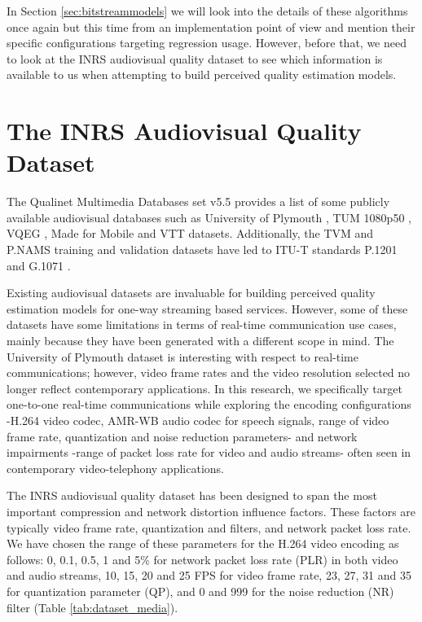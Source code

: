 \documentclass[journal]{IEEEtran}
\begin{document}
In Section \ref{sec:bitstreammodels} we will look into the details of these algorithms once again but this time from an implementation point of view and mention their specific configurations targeting regression usage. However, before that, we need to look at the INRS audiovisual quality dataset to see which information is available to us when attempting to build perceived quality estimation models.

\newcommand{\frigginfigurewidth}{2.4in}
\section{The INRS Audiovisual Quality Dataset}
\label{sec:dataset}

The Qualinet Multimedia Databases set v5.5 \cite{fliegel2014qualinet} provides a list of some publicly available audiovisual databases such as University of Plymouth \cite{goudarzi2010audiovisual}, TUM 1080p50 \cite{keimel2012tum}, VQEG \cite{pinson2012influence}, Made for Mobile \cite{robitza2012made} and VTT \cite{maki2013reduced} datasets. Additionally, the TVM and P.NAMS training and validation datasets \cite{garcia2014parametric} have led to ITU-T standards P.1201 \cite{itut2012P.1201} and G.1071 \cite{itut2015G.1071}.

Existing audiovisual datasets are invaluable for building perceived quality estimation models for one-way streaming based services. However, some of these datasets have some limitations in terms of real-time communication use cases, mainly because they have been generated with a different scope in mind. The University of Plymouth dataset is interesting with respect to real-time communications; however, video frame rates and the video resolution selected no longer reflect contemporary applications. In this research, we specifically target one-to-one real-time communications while exploring the encoding configurations -H.264 video codec, AMR-WB audio codec for speech signals, range of video frame rate, quantization and noise reduction parameters- and network impairments -range of packet loss rate for video and audio streams- often seen in contemporary video-telephony applications.

The INRS audiovisual quality dataset has been designed to span the most important compression and network distortion influence factors. These factors are typically video frame rate, quantization and filters, and network packet loss rate. We have chosen the range of these parameters for the H.264 video encoding as follows: 0, 0.1, 0.5, 1 and 5\% for network packet loss rate (PLR) in both video and audio streams, 10, 15, 20 and 25 FPS for video frame rate, 23, 27, 31 and 35 for quantization parameter (QP), and 0 and 999 for the noise reduction (NR) filter (Table \ref{tab:dataset_media}).
\end{document}
